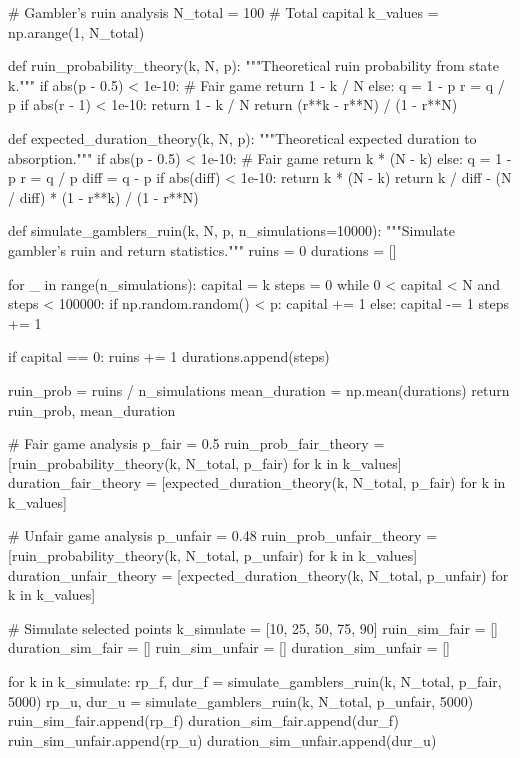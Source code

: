 \documentclass[a4paper, 11pt]{article}
\begin{document}
\begin{pycode}
# Gambler's ruin analysis
N_total = 100  # Total capital
k_values = np.arange(1, N_total)

def ruin_probability_theory(k, N, p):
    """Theoretical ruin probability from state k."""
    if abs(p - 0.5) < 1e-10:  # Fair game
        return 1 - k / N
    else:
        q = 1 - p
        r = q / p
        if abs(r - 1) < 1e-10:
            return 1 - k / N
        return (r**k - r**N) / (1 - r**N)

def expected_duration_theory(k, N, p):
    """Theoretical expected duration to absorption."""
    if abs(p - 0.5) < 1e-10:  # Fair game
        return k * (N - k)
    else:
        q = 1 - p
        r = q / p
        diff = q - p
        if abs(diff) < 1e-10:
            return k * (N - k)
        return k / diff - (N / diff) * (1 - r**k) / (1 - r**N)

def simulate_gamblers_ruin(k, N, p, n_simulations=10000):
    """Simulate gambler's ruin and return statistics."""
    ruins = 0
    durations = []

    for _ in range(n_simulations):
        capital = k
        steps = 0
        while 0 < capital < N and steps < 100000:
            if np.random.random() < p:
                capital += 1
            else:
                capital -= 1
            steps += 1

        if capital == 0:
            ruins += 1
        durations.append(steps)

    ruin_prob = ruins / n_simulations
    mean_duration = np.mean(durations)
    return ruin_prob, mean_duration

# Fair game analysis
p_fair = 0.5
ruin_prob_fair_theory = [ruin_probability_theory(k, N_total, p_fair) for k in k_values]
duration_fair_theory = [expected_duration_theory(k, N_total, p_fair) for k in k_values]

# Unfair game analysis
p_unfair = 0.48
ruin_prob_unfair_theory = [ruin_probability_theory(k, N_total, p_unfair) for k in k_values]
duration_unfair_theory = [expected_duration_theory(k, N_total, p_unfair) for k in k_values]

# Simulate selected points
k_simulate = [10, 25, 50, 75, 90]
ruin_sim_fair = []
duration_sim_fair = []
ruin_sim_unfair = []
duration_sim_unfair = []

for k in k_simulate:
    rp_f, dur_f = simulate_gamblers_ruin(k, N_total, p_fair, 5000)
    rp_u, dur_u = simulate_gamblers_ruin(k, N_total, p_unfair, 5000)
    ruin_sim_fair.append(rp_f)
    duration_sim_fair.append(dur_f)
    ruin_sim_unfair.append(rp_u)
    duration_sim_unfair.append(dur_u)


\end{pycode}
\end{document}
